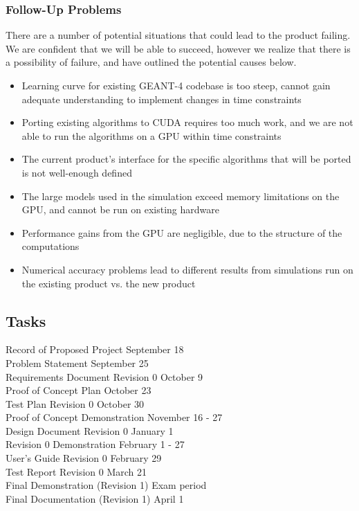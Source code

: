 \documentclass[12pt]{article}
\begin{document}
\subsubsection{Follow-Up Problems}
There are a number of potential situations that could lead to the product failing. We are confident that we will be able to succeed, however we realize that there is a possibility of failure, and have outlined the potential causes below.
\begin{itemize}
\item Learning curve for existing GEANT-4 codebase is too steep, cannot gain adequate understanding to implement changes in time constraints
\item Porting existing algorithms to CUDA requires too much work, and we are not able to run the algorithms on a GPU within time constraints
\item The current product's interface for the specific algorithms that will be ported is not well-enough defined
\item The large models used in the simulation exceed memory limitations on the GPU, and cannot be run on existing hardware
\item Performance gains from the GPU are negligible, due to the structure of the computations
\item Numerical accuracy problems lead to different results from simulations run on the existing product vs. the new product
\end{itemize}

\subsection{Tasks}\label{SubSec_Tasks} %
Record of Proposed Project \hfill September 18\\
Problem Statement \hfill September 25\\
Requirements Document Revision 0 \hfill October 9\\
Proof of Concept Plan \hfill October 23\\
Test Plan Revision 0 \hfill October 30\\
Proof of Concept Demonstration \hfill November 16 - 27\\
Design Document Revision 0 \hfill January 1\\
Revision 0 Demonstration \hfill February 1 - 27\\
User's Guide Revision 0 \hfill February 29\\
Test Report Revision 0 \hfill March 21\\
Final Demonstration (Revision 1) \hfill Exam period\\
Final Documentation (Revision 1) \hfill April 1
\end{document}
